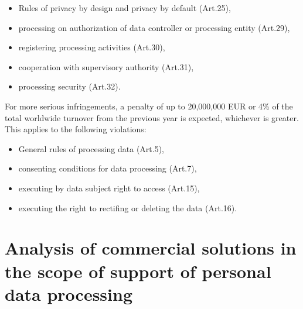 \documentclass[en, noamssymb]{mgr}
\begin{document}
\begin{itemize}

\item Rules of privacy by design and privacy by default (Art.25),

\item processing on authorization of data controller or processing entity (Art.29),

\item registering processing activities (Art.30),

\item cooperation with supervisory authority (Art.31),

\item processing security (Art.32).

\end{itemize}

For more serious infringements, a penalty of up to 20,000,000 EUR or 4\% of the total worldwide turnover from the previous year is expected, whichever is greater. This applies to the following violations:

\begin{itemize}

\item General rules of processing data (Art.5),

\item consenting conditions for data processing (Art.7),

\item executing by data subject right to access (Art.15),

\item executing the right to rectifing or deleting the data (Art.16).

\end{itemize}

\chapter{Analysis of commercial solutions in the scope of support of personal data processing} \label{sec:sekcjaAnalizaRozwiazan}
\end{document}
